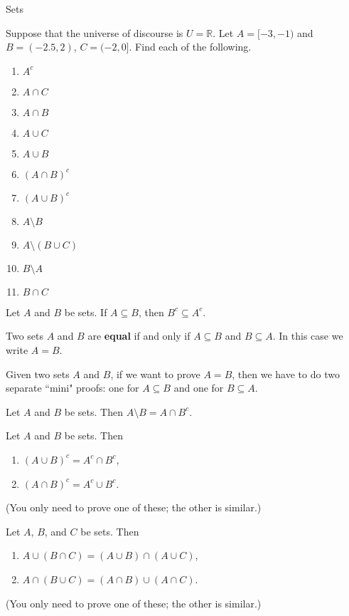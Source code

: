 \begin{section}{Sets}
\begin{exercise}
Suppose that the universe of discourse is $U=\mathbb{R}$.  Let $A=[-3,-1)$ and $B=(-2.5,2)$, $C=(-2,0]$.  Find each of the following.
\begin{enumerate}
\item $A^c$
  \item $A \cap C$
  \item $A \cap B$
  \item $A \cup C$
  \item $A \cup B$
  \item $(A\cap B)^c$
  \item $(A\cup B)^c$
  \item $A \setminus B$
  \item $A\setminus (B \cup C)$
  \item $B \setminus A$
  \item $B \cap C$
\end{enumerate}
\end{exercise}

\begin{theorem}[*]
Let $A$ and $B$ be sets.  If $A \subseteq B$, then $B^c \subseteq A^c$.
\end{theorem}

\begin{definition}
Two sets $A$ and $B$ are \textbf{equal} if and only if $A \subseteq B$ and $B \subseteq A$.  In this case we write $A = B$.
\end{definition}

\begin{remark}
Given two sets $A$ and $B$, if we want to prove $A=B$, then we have to do two separate ``mini" proofs: one for $A\subseteq B$ and one for $B\subseteq A$.
\end{remark}

\begin{theorem}[*]
Let $A$ and $B$ be sets.  Then $A\setminus B = A \cap B^c$.
\end{theorem}

\begin{theorem}
Let $A$ and $B$ be sets. Then 
\begin{enumerate}
\item $(A \cup B)^c = A^c \cap B^c$,
\item $(A \cap B)^c = A^c \cup B^c$.
\end{enumerate}
(You only need to prove one of these; the other is similar.)
\end{theorem}

\begin{theorem}
Let $A$, $B$, and $C$ be sets. Then
\begin{enumerate}
\item $A \cup(B\cap C) = (A\cup B)\cap (A\cup C)$,
\item $A\cap (B\cup C)= (A\cap B)\cup (A\cap C)$.
\end{enumerate}
(You only need to prove one of these; the other is similar.)
\end{theorem}

\end{section}
